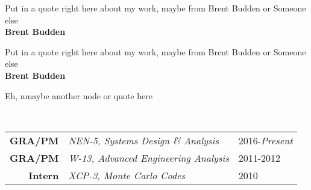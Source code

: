 

\begin{minipage}{0.35\textwidth}
	\begin{mdframed}[roundcorner=10pt,tikzsetting={dashed}]
		\begin{center}
			Put in a quote right here about my work, maybe from Brent Budden or Someone else \\ \textbf{Brent Budden}
		\end{center}
	\end{mdframed}
\end{minipage}%
\begin{minipage}{0.35\textwidth}
	\begin{tcolorbox}[width=1.0\linewidth,title=Brent Budden, halign=center, colframe=black, colback=blue!05, boxsep=1mm, arc=3mm,
		center title]%
		Put in a quote right here about my work, maybe from Brent Budden or Someone else \\ \textbf{Brent Budden}
	\end{tcolorbox}
\end{minipage}%
\begin{minipage}{0.35\textwidth}
	Eh, nmaybe another node or quote here
\end{minipage}

\\

\begin{minipage}{\textwidth}
	\begin{center}
		\begin{tabular}{rll}
			\textbf{GRA/PM} & \textit{NEN-5, Systems Design \& Analysis} & 2016-\emph{Present} \\
			\textbf{GRA/PM} & \textit{W-13, Advanced Engineering Analysis} & 2011-2012 \\ 
			\textbf{Intern} & \textit{XCP-3, Monte Carlo Codes} & 2010 \\
		\end{tabular}
	\end{center}
\end{minipage}%


